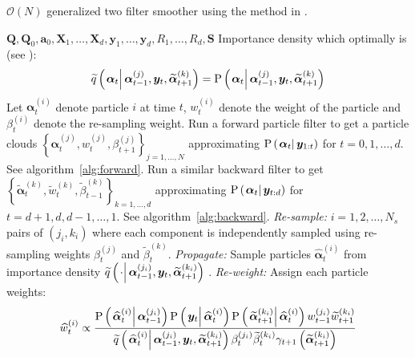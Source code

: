 \documentclass[9pt, notitlepage]{article}
\newcommand\StateXX{\Statex\hspace{\algorithmicindent}\hspace{\algorithmicindent}}
\renewcommand{\vec}[1]{\bm{#1}}
\newcommand{\mat}[1]{\mathbf{#1}}
\newcommand{\Lbrace}[1]{\left\{ #1\right\}}
\newcommand{\Lparen}[1]{\left( #1\right)}
\newcommand{\Cond}[2]{\left. #1 \vphantom{#2} \right\vert  #2}
\newcommand{\Prob}{\text{P}}
\newcommand{\optor}[2]{#1\Lparen{#2}}
\newcommand{\optorC}[3]{\optor{#1}{\Cond{#2}{#3}}}
\newcommand{\propC}[2]{\optorC{\Prob}{#1}{#2}}
\newcommand{\IDAproxC}[2]{\optorC{\widetilde{q}}{#1}{#2}}
\newcommand{\partic}[3]{#1_{#2}^{\Lparen{#3}}}
\newcommand{\particB}[3]{\widetilde{#1}_{#2}^{\Lparen{#3}}}
\newcommand{\particS}[3]{\widehat{#1}_{#2}^{\Lparen{#3}}}
\newcommand{\bigO}[1]{\mathcal{O}\Lparen{#1}}
\newcommand{\nPart}{N}
\newcommand{\nPeriods}{d}
\begin{document}
\newpage

\begin{algorithm}[H]
\caption{$\bigO{\nPart}$ generalized two filter smoother using the method in \cite{fearnhead10}.}\label{alg:ONsmoother}
\begin{algorithmic}[1]\raggedright
\INPUT
\Statex $\mat{Q},\mat{Q}_0,\vec{a}_0,\mat{X}_1,\dots,\mat{X}_d,\vec{y}_1,\dots,\vec{y}_d,R_1,\dots,R_d,\mat{S}$
%
\Statex Importance density which optimally is (see \citet[page 453]{fearnhead10}):
\Statex \begin{equation}
	\IDAproxC{\vec{\alpha}_t}{\partic{\vec{\alpha}}{t-1}{j},\vec{y}_t, \particB{\vec{\alpha}}{t+1}{k}} =
%
	\propC{\vec{\alpha}_t}{\partic{\vec{\alpha}}{t-1}{j},\vec{y}_t, \particB{\vec{\alpha}}{t+1}{k}}
\end{equation}
%
%
\Statex Let $\partic{\vec{\alpha}}{t}{i}$ denote particle $i$ at time $t$, $\partic{w}{t}{i}$ denote the weight of the particle and $\partic{\beta}{t}{i}$ denote the re-sampling weight.
%
\State Run a forward particle filter to get a particle clouds %
	$\Lbrace{\partic{\vec{\alpha}}{t}{j}, \partic{w}{t}{j}, \partic{\beta}{t + 1}{j}}_{j=1,\dots,\nPart}$ %
	approximating $\propC{\vec{\alpha}_t}{\vec{y}_{1:t}}$ for $t = 0, 1, \dots, \nPeriods$. See algorithm~\ref{alg:forward}.
\EndProcedure
%
\State Run a similar backward filter to get %
	$\Lbrace{\particB{\vec{\alpha}}{t}{k}, \particB{w}{t}{k}, \particB{\beta}{t - 1}{k}}_{k=1,\dots,\nPeriods}$  %
	approximating $\propC{\vec{\alpha}_t}{\vec{y}_{t:\nPeriods}}$ for $t = \nPeriods + 1, \nPeriods, \nPeriods - 1, \dots, 1$. See algorithm~\ref{alg:backward}.
\EndProcedure
%
\For{$t=1,\dots, \nPart$}
\StateXX \emph{Re-sample:}
\State $i=1,2,\dots,\nPart_s$ pairs of $\Lparen{j_i, k_i}$ where each component is independently sampled using re-sampling weights $\partic{\beta}{t}{j}$ and $\particB{\beta}{t}{k}$.
%
\StateXX \emph{Propagate:}
\State Sample particles $\particS{\vec{\alpha}}{t}{i}$ from importance density %
	$\IDAproxC{\cdot}{\partic{\vec{\alpha}}{t-1}{j_i},\vec{y}_t, \particB{\vec{\alpha}}{t + 1}{k_i}}$%
.%
\StateXX \emph{Re-weight:}
\State Assign each particle weights:
\StateXX \begin{equation}\label{eqn:combineWeight}
 \particS{w}{t}{i} \propto \frac{
 	\propC{\particS{\vec{\alpha}}{t}{i}}{\partic{\vec{\alpha}}{t - 1}{j_i}}
 	\propC{\vec{y}_t}{\particS{\vec{\alpha}}{t}{i}}
 	\propC{\particB{\vec{\alpha}}{t + 1}{k_i}}{\particS{\vec{\alpha}}{t}{i}}
 	\partic{w}{t - 1}{j_i}\particB{w}{t + 1}{k_i}
 	}{ %
 	\IDAproxC{\particS{\vec{\alpha}}{t}{i}}{\partic{\vec{\alpha}}{t-1}{j_i},\vec{y}_t, \particB{\vec{\alpha}}{t+1}{k_i}}
 	\partic{\beta}{t}{j_i}\particB{\beta}{t}{k_i}\gamma_{t +1}\Lparen{\particB{\vec{\alpha}}{t+1}{k_i}}
 	} %
\end{equation}
\EndFor
\EndProcedure
\end{algorithmic}
\end{algorithm}
\end{document}

